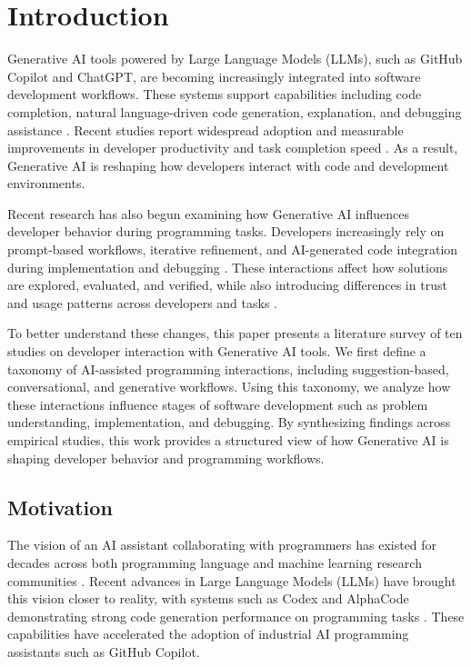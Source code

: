 \section{Introduction}
Generative AI tools powered by Large Language Models (LLMs), such as GitHub Copilot and ChatGPT, are becoming increasingly integrated into software development workflows. These systems support capabilities including code completion, natural language-driven code generation, explanation, and debugging assistance \cite{vaithilingam2022expectation, barke2022grounded}. Recent studies report widespread adoption and measurable improvements in developer productivity and task completion speed \cite{peng2023copilot, bird2023copilot}. As a result, Generative AI is reshaping how developers interact with code and development environments.

Recent research has also begun examining how Generative AI influences developer behavior during programming tasks. Developers increasingly rely on prompt-based workflows, iterative refinement, and AI-generated code integration during implementation and debugging \cite{vaithilingam2022expectation, kazemitabaar2023copilot}. These interactions affect how solutions are explored, evaluated, and verified, while also introducing differences in trust and usage patterns across developers and tasks \cite{barke2022grounded, mao2026empirical}.

To better understand these changes, this paper presents a literature survey of ten studies on developer interaction with Generative AI tools. We first define a taxonomy of AI-assisted programming interactions, including suggestion-based, conversational, and generative workflows. Using this taxonomy, we analyze how these interactions influence stages of software development such as problem understanding, implementation, and debugging. By synthesizing findings across empirical studies, this work provides a structured view of how Generative AI is shaping developer behavior and programming workflows.

\subsection{Motivation}
The vision of an AI assistant collaborating with programmers has existed for decades across both programming language and machine learning research communities \cite{ferdowsifard2021LooPy,miltner2019edit,raychev2014code,xu2020externalknowledge}. Recent advances in Large Language Models (LLMs) have brought this vision closer to reality, with systems such as Codex and AlphaCode demonstrating strong code generation performance on programming tasks \cite{li2023competition,vaswani2023attention, chen2021evaluatingllm}. These capabilities have accelerated the adoption of industrial AI programming assistants such as GitHub Copilot.

